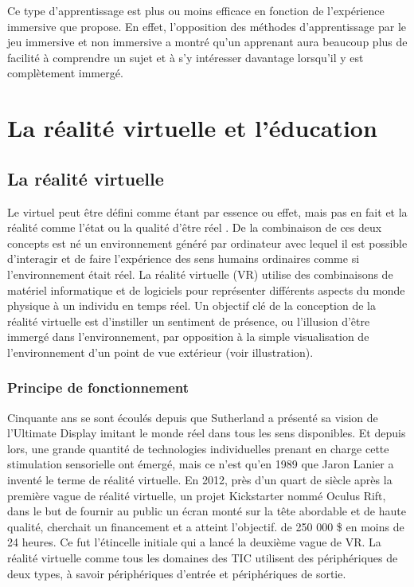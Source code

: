 Ce type d'apprentissage est plus ou moins efficace en fonction de l'expérience immersive que propose. En effet, l'opposition des méthodes d'apprentissage par le jeu immersive et non immersive a montré qu'un apprenant aura beaucoup plus de facilité à comprendre un sujet et à s'y intéresser davantage lorsqu'il y est complètement immergé\cite{de2017motivational,Shackelford2019RelationshipsBC,Abdelaziz2020TheIO}.

\section{La réalité virtuelle et l'éducation}
\subsection{La réalité virtuelle}

Le virtuel peut être défini comme \og étant par essence ou effet, mais pas en fait \fg\cite{Jerald2015WhatIV} et la réalité comme \og l'état ou la qualité d'être réel \fg\cite{Jerald2015WhatIV}.
De la combinaison de ces deux concepts est né un environnement généré par ordinateur avec lequel il est possible d'interagir et de faire l'expérience des sens humains ordinaires comme si l'environnement était réel\cite{Rheingold1991VirtualR}.
La réalité virtuelle (VR) utilise des combinaisons de matériel informatique et de logiciels pour représenter différents aspects du monde physique à un individu en temps réel.
Un objectif clé de la conception de la réalité virtuelle est d'instiller un sentiment de présence, ou l'illusion d'être immergé dans l'environnement, par opposition à la simple visualisation de l'environnement d'un point de vue extérieur (voir illustration).

\subsubsection{Principe de fonctionnement}

Cinquante ans se sont écoulés depuis que Sutherland a présenté sa vision de l'Ultimate Display\cite{sutherland1965ultimate} imitant le monde réel dans tous les sens disponibles.
Et depuis lors, une grande quantité de technologies individuelles prenant en charge cette stimulation sensorielle ont émergé, mais ce n'est qu'en 1989 que Jaron Lanier a inventé le terme de réalité virtuelle\cite{Rheingold1991VirtualR}.
En 2012, près d'un quart de siècle après la première vague de réalité virtuelle, un projet Kickstarter nommé Oculus Rift, dans le but de fournir au public un écran monté sur la tête abordable et de haute qualité, cherchait un financement et a atteint l'objectif. de 250 000 \$ en moins de 24 heures. Ce fut l'étincelle initiale qui a lancé la deuxième vague de VR\cite{anthes2016state}.
La réalité virtuelle comme tous les domaines des TIC utilisent des périphériques de deux types, à savoir périphériques d'entrée et périphériques de sortie.

